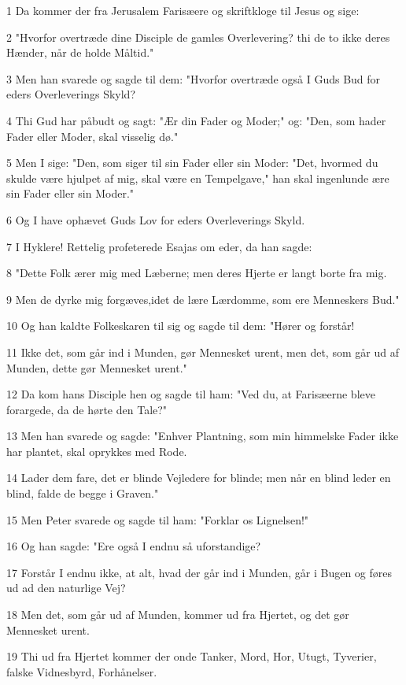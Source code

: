 \par 1 Da kommer der fra Jerusalem Farisæere og skriftkloge til Jesus og sige:
\par 2 "Hvorfor overtræde dine Disciple de gamles Overlevering? thi de to ikke deres Hænder, når de holde Måltid."
\par 3 Men han svarede og sagde til dem: "Hvorfor overtræde også I Guds Bud for eders Overleverings Skyld?
\par 4 Thi Gud har påbudt og sagt: "Ær din Fader og Moder;" og: "Den, som hader Fader eller Moder, skal visselig dø."
\par 5 Men I sige: "Den, som siger til sin Fader eller sin Moder: "Det, hvormed du skulde være hjulpet af mig, skal være en Tempelgave," han skal ingenlunde ære sin Fader eller sin Moder."
\par 6 Og I have ophævet Guds Lov for eders Overleverings Skyld.
\par 7 I Hyklere! Rettelig profeterede Esajas om eder, da han sagde:
\par 8 "Dette Folk ærer mig med Læberne; men deres Hjerte er langt borte fra mig.
\par 9 Men de dyrke mig forgæves,idet de lære Lærdomme, som ere Menneskers Bud."
\par 10 Og han kaldte Folkeskaren til sig og sagde til dem: "Hører og forstår!
\par 11 Ikke det, som går ind i Munden, gør Mennesket urent, men det, som går ud af Munden, dette gør Mennesket urent."
\par 12 Da kom hans Disciple hen og sagde til ham: "Ved du, at Farisæerne bleve forargede, da de hørte den Tale?"
\par 13 Men han svarede og sagde: "Enhver Plantning, som min himmelske Fader ikke har plantet, skal oprykkes med Rode.
\par 14 Lader dem fare, det er blinde Vejledere for blinde; men når en blind leder en blind, falde de begge i Graven."
\par 15 Men Peter svarede og sagde til ham: "Forklar os Lignelsen!"
\par 16 Og han sagde: "Ere også I endnu så uforstandige?
\par 17 Forstår I endnu ikke, at alt, hvad der går ind i Munden, går i Bugen og føres ud ad den naturlige Vej?
\par 18 Men det, som går ud af Munden, kommer ud fra Hjertet, og det gør Mennesket urent.
\par 19 Thi ud fra Hjertet kommer der onde Tanker, Mord, Hor, Utugt, Tyverier, falske Vidnesbyrd, Forhånelser.
